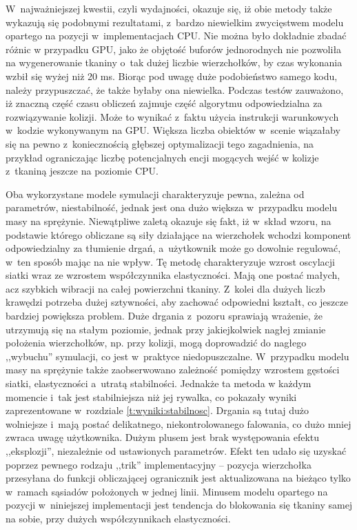 	W~najważniejszej kwestii, czyli wydajności, okazuje się, iż obie metody także wykazują się podobnymi rezultatami, z~bardzo niewielkim zwycięstwem modelu opartego na pozycji w~implementacjach CPU. Nie można było dokładnie zbadać różnic w przypadku GPU, jako że objętość buforów jednorodnych nie pozwoliła na wygenerowanie tkaniny o~tak dużej liczbie wierzchołków, by czas wykonania wzbił się wyżej niż 20 ms. Biorąc pod uwagę duże podobieństwo samego kodu, należy przypuszczać, że także byłaby ona niewielka. Podczas testów zauważono, iż znaczną część czasu obliczeń zajmuje część algorytmu odpowiedzialna za rozwiązywanie kolizji. Może to wynikać z~faktu użycia instrukcji warunkowych w~kodzie wykonywanym na GPU. Większa liczba obiektów w~scenie wiązałaby się na pewno z~koniecznością głębszej optymalizacji tego zagadnienia, na przykład ograniczając liczbę potencjalnych encji mogących wejść w kolizje z~tkaniną jeszcze na poziomie CPU.
	
	Oba wykorzystane modele symulacji charakteryzuje pewna, zależna od parametrów, niestabilność, jednak jest ona dużo większa w~przypadku modelu masy na sprężynie. Niewątpliwe zaletą okazuje się fakt, iż w~skład wzoru, na podstawie którego obliczane są siły działające na wierzchołek wchodzi komponent odpowiedzialny za tłumienie drgań, a~użytkownik może go dowolnie regulować, w~ten sposób mając na nie wpływ. Tę metodę charakteryzuje wzrost oscylacji siatki wraz ze wzrostem współczynnika elastyczności. Mają one postać małych, acz szybkich wibracji na całej powierzchni tkaniny. Z~kolei dla dużych liczb krawędzi potrzeba dużej sztywności, aby zachować odpowiedni kształt, co jeszcze bardziej powiększa problem. Duże drgania z~pozoru sprawiają wrażenie, że utrzymują się na stałym poziomie, jednak przy jakiejkolwiek nagłej zmianie położenia wierzchołków, np. przy kolizji, mogą doprowadzić do nagłego ,,wybuchu'' symulacji, co jest w~praktyce niedopuszczalne. W~przypadku modelu masy na sprężynie także zaobserwowano zależność pomiędzy wzrostem gęstości siatki, elastyczności a~utratą stabilności. Jednakże ta metoda w każdym momencie i~tak jest stabilniejsza niż jej rywalka, co pokazały wyniki zaprezentowane w~rozdziale \ref{t:wyniki:stabilnosc}. Drgania są tutaj dużo wolniejsze i~mają postać delikatnego, niekontrolowanego falowania, co dużo mniej zwraca uwagę użytkownika. Dużym plusem jest brak występowania efektu ,,eksplozji'', niezależnie od ustawionych parametrów. Efekt ten udało się uzyskać poprzez pewnego rodzaju ,,trik'' implementacyjny -- pozycja wierzchołka przesyłana do funkcji obliczającej ogranicznik jest aktualizowana na bieżąco tylko w~ramach sąsiadów położonych w jednej linii. Minusem modelu opartego na pozycji w~niniejszej implementacji jest tendencja do blokowania się tkaniny samej na sobie, przy dużych współczynnikach elastyczności.
	
